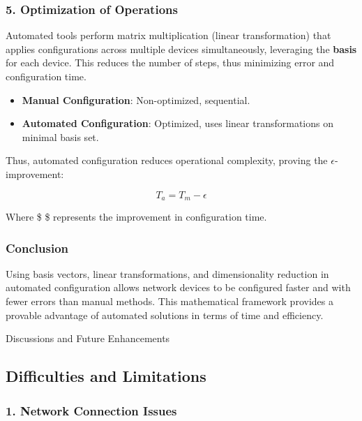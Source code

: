 \documentclass[11pt]{article}
\providecommand{\tightlist}{%
      \setlength{\itemsep}{0pt}\setlength{\parskip}{0pt}}
\begin{document}
\hypertarget{optimization-of-operations}{%
\subsubsection{5. Optimization of
Operations}\label{optimization-of-operations}}

Automated tools perform matrix multiplication (linear transformation)
that applies configurations across multiple devices simultaneously,
leveraging the \textbf{basis} for each device. This reduces the number
of steps, thus minimizing error and configuration time.

\begin{itemize}
\tightlist
\item
  \textbf{Manual Configuration}: Non-optimized, sequential.
\item
  \textbf{Automated Configuration}: Optimized, uses linear
  transformations on minimal basis set.
\end{itemize}

Thus, automated configuration reduces operational complexity, proving
the \(\epsilon\)-improvement:

\[
T_a = T_m - \epsilon
\]

Where \$ \epsilon \$ represents the improvement in configuration time.

\hypertarget{conclusion}{%
\subsubsection{Conclusion}\label{conclusion}}

Using basis vectors, linear transformations, and dimensionality
reduction in automated configuration allows network devices to be
configured faster and with fewer errors than manual methods. This
mathematical framework provides a provable advantage of automated
solutions in terms of time and efficiency.

    

    Discussions and Future Enhancements

    \hypertarget{difficulties-and-limitations}{%
\subsection{Difficulties and
Limitations}\label{difficulties-and-limitations}}

\hypertarget{network-connection-issues}{%
\subsubsection{\texorpdfstring{1. \textbf{Network Connection
Issues}}{1. Network Connection Issues}}\label{network-connection-issues}}
\end{document}
